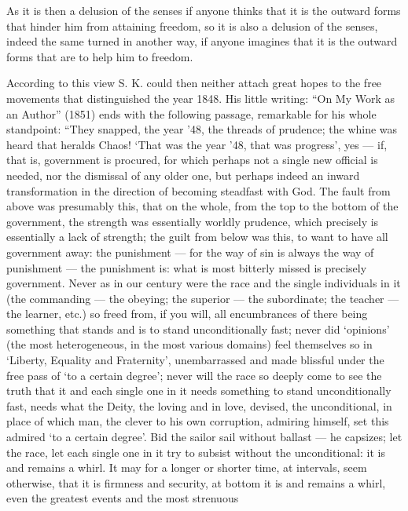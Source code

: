 \documentclass[12pt,a4paper,openany]{book}
\newcommand{\opage}[1]{\marginnote{\footnotesize\textit{[#1]}}}
\begin{document}
As it is then a delusion of the senses if anyone thinks
that it is the outward forms that hinder him from attaining
freedom, so it is also a delusion of the senses, indeed the
same turned in another way, if anyone imagines
that it is the outward forms that are to help him
to freedom.

According to this view S. K. could then neither
attach great hopes to the free movements that
distinguished the year 1848. His little writing: ``On My
Work as an Author'' (1851) ends with the following passage, remarkable for his whole
standpoint: ``They snapped, the
\setcounter{footnote}{0}%
\opage{7}year '48, the threads of prudence; the whine was heard
that heralds Chaos! `That was the year '48, that was
progress', yes --- if, that is, government is procured,
for which perhaps not a single
new official is needed, nor the dismissal of any older one, but
perhaps indeed an inward transformation in the direction of becoming
steadfast with God. The fault from above was presumably this, that on the
whole, from the top to the bottom of the government,
the strength was essentially worldly prudence, which precisely
is essentially a lack of strength; the guilt from below
was this, to want to have all government away: the punishment ---
for the way of sin is always the way of punishment --- the punishment
is: what is most bitterly missed is precisely government.
Never as in our century were the race and the
single individuals in it (the commanding --- the obeying; the superior
--- the subordinate; the teacher --- the learner,
etc.) so freed from, if you will, all
encumbrances of there being something that stands and is to stand unconditionally fast;
never did `opinions' (the most heterogeneous,
in the most various domains) feel themselves so in `Liberty, Equality
and Fraternity', unembarrassed and made blissful under
the free pass of `to a certain degree'; never will the race so
deeply come to see the truth that it and each single one in it
needs something to stand unconditionally fast, needs
what the Deity, the loving and in love,
devised, the unconditional, in place of which man,
the clever to his own corruption, admiring himself, set
this admired `to a certain degree'. Bid the sailor
sail without ballast --- he capsizes; let the race, let
each single one in it try to subsist without the unconditional:
it is and remains a whirl. It may for a longer or
\setcounter{footnote}{0}%
\opage{8}shorter time, at intervals, seem otherwise, that it is
firmness and security, at bottom it is and remains a whirl,
even the greatest events and the most strenuous
\end{document}
